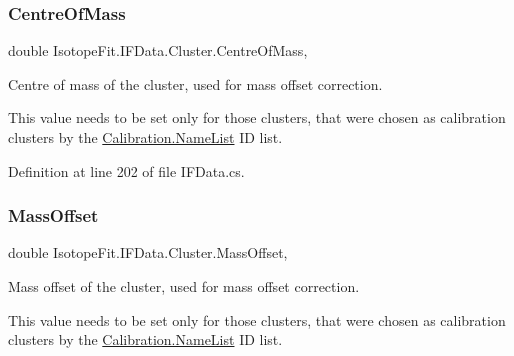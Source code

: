 \mbox{\label{class_isotope_fit_1_1_i_f_data_1_1_cluster_a43d9e77aebe1e02b617b16aff448c613}} 
\subsubsection{\texorpdfstring{Centre\+Of\+Mass}{CentreOfMass}}
{\footnotesize\ttfamily double Isotope\+Fit.\+I\+F\+Data.\+Cluster.\+Centre\+Of\+Mass\hspace{0.3cm}{\ttfamily [get]}, {\ttfamily [set]}}



Centre of mass of the cluster, used for mass offset correction. 

This value needs to be set only for those clusters, that were chosen as calibration clusters by the \hyperlink{class_isotope_fit_1_1_i_f_data_1_1_calibration_a2e347f087df878f22010302bda7db4be}{Calibration.\+Name\+List} ID list. 

Definition at line 202 of file I\+F\+Data.\+cs.

\mbox{\label{class_isotope_fit_1_1_i_f_data_1_1_cluster_afa64046ba8bdad51edc7ca5c1c39cd8c}} 
\subsubsection{\texorpdfstring{Mass\+Offset}{MassOffset}}
{\footnotesize\ttfamily double Isotope\+Fit.\+I\+F\+Data.\+Cluster.\+Mass\+Offset\hspace{0.3cm}{\ttfamily [get]}, {\ttfamily [set]}}



Mass offset of the cluster, used for mass offset correction. 

This value needs to be set only for those clusters, that were chosen as calibration clusters by the \hyperlink{class_isotope_fit_1_1_i_f_data_1_1_calibration_a2e347f087df878f22010302bda7db4be}{Calibration.\+Name\+List} ID list. 

